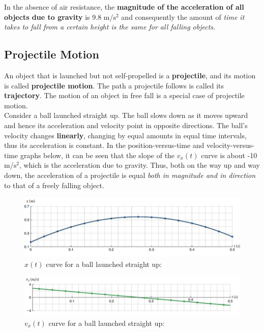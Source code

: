         In the absence of air resistance, the \textbf{magnitude of the acceleration of all objects due to gravity} is $\bm{9.8}$ m/$\text{s}^2$ and consequently the amount of \textit{time it takes to fall from a certain height
        is the same for all falling objects.}



    \subsection{Projectile Motion}
        An object that is launched but not self-propelled is a \textbf{projectile}, and its motion is called \textbf{projectile motion}. The path a projectile follows is called its \textbf{trajectory}. The motion of an
        object in free fall is a special case of projectile motion. \\

        Consider a ball launched straight up. The ball slows down as it moves upward and hence its acceleration and velocity point in opposite directions. The ball's velocity changes \textbf{linearly}, changing by
        equal amounts in equal time intervals, thus its acceleration is constant. In the position-versus-time and velocity-versus-time graphs below, it can be seen that the slope of the $v_x (t)$ curve is about
        -10 m/$\text{s}^2$, which is the acceleration due to gravity. Thus, both on the way up and way down, the acceleration of a projectile is equal \textit{both in magnitude and in direction} to that of a freely falling
        object.

        \begin{figure}[hbt!]
            \centering
            \caption*{$x(t)$ curve for a ball launched straight up:}
            \includegraphics[scale=0.8]{Resources/Projectile_Motion}
        \end{figure}

        \begin{figure}[hbt!]
            \centering
            \caption*{$v_x (t)$ curve for a ball launched straight up:}
            \includegraphics[scale=0.9]{Resources/Projectile_Motion2}
        \end{figure}


